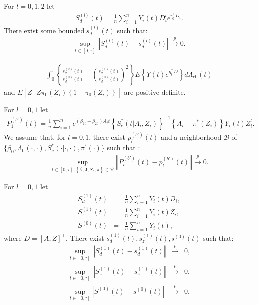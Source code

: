 \documentclass[11pt]{article}
\newcommand{\eqnn}{\begin{eqnarray*}}
\newcommand{\een}{\end{eqnarray*}}
\begin{document}
\begin{assumptionA*}\label{ifn}
For $l=0,1,2$ let
\eqnn
S_d^{(l)}(t)=\frac{1}{n}\sum_{i=1}^nY_i(t)D^{l}_ie^{\eta_0^\top D_i}.
\een
There exist some bounded $s_d^{(l)}(t)$ such that:
\eqnn
\sup_{t \in [0,\tau]} \left\Vert S_d^{(l)}(t)-s_d^{(l)}(t)\right\Vert \overset{p}{\rightarrow} 0.
\een
\end{assumptionA*}

\begin{assumptionA*}\label{posdefbisn}
\eqnn\int_0^\tau \left\{\frac{s_d^{(2)}(t)}{s_d^{(0)}(t)}-\left(\frac{s_d^{(1)}(t)}{s_d^{(0)}(t)}\right)^2\right\}E\left\{Y(t)e^{\eta_0^\top D}\right\}d\Lambda_{c0}(t)\een and 
$ E\left[Z^\top Z \pi_0(Z_i)\left\{1-\pi_0(Z_i)\right\}\right]$ are positive definite.
\end{assumptionA*}

\begin{assumptionB*}\label{if1nnn}
For $l=0,1$ let
\eqnn
P^{(b')}_{1}(t) = \frac{1}{n}\sum_{i=1}^n e^{ (\beta_{10}  + \beta_{20}) A_i t} \left\{S^{*}_c(t | A_i,Z_i)\right\}^{-1}\left\{A_i -\pi^{*}( Z_i)\right\}Y_i(t)Z_i^l.
\een
We assume that, for $l=0,1$, there exist $p^{(b')}_{l}(t)$ and a neighborhood $\mathcal{B}$ of  \\$\{\beta_0,\Lambda_{0}(\cdot,\cdot), S^{*}_{c}(\cdot | \cdot,\cdot), \pi^{*}(\cdot)\}$ such that :
\eqnn
\sup_{t \in [0,\tau],  \left\{\beta,\Lambda, S_c, \pi\right\} \in \mathcal{B}} \left\Vert P^{(b')}_{l}(t)-p^{(b')}_{l}(t)\right\Vert \overset{p}{\rightarrow} 0.\een
\end{assumptionB*}

\begin{assumptionB*}\label{if2n}%
For $l=0,1$ let
\eqnn
S_d^{(1)}(t) &=& \frac{1}{n}\sum_{i=1}^nY_i(t)D_i,\\
S_z^{(1)}(t) &=& \frac{1}{n}\sum_{i=1}^nY_i(t)Z_i,\\
S^{(0)}(t) &=& \frac{1}{n}\sum_{i=1}^nY_i(t),
\een
where $D=[A,Z]^\top$.
There exist $s_d^{(1)}(t),s_z^{(1)}(t),s^{(0)}(t)$ such that:
\eqnn
\sup_{t \in [0,\tau]} \left\Vert S_d^{(1)}(t)-s_d^{(1)}(t)\right\Vert &\overset{p}{\rightarrow} & 0,\\
\sup_{t \in [0,\tau]} \left\Vert S_z^{(1)}(t)-s_z^{(1)}(t)\right\Vert  &\overset{p}{\rightarrow} & 0,\\
\sup_{t \in [0,\tau]} \left|S^{(0)}(t)-s^{(0)}(t)\right| &\overset{p}{\rightarrow} & 0.\een
\end{assumptionB*}
\end{document}
